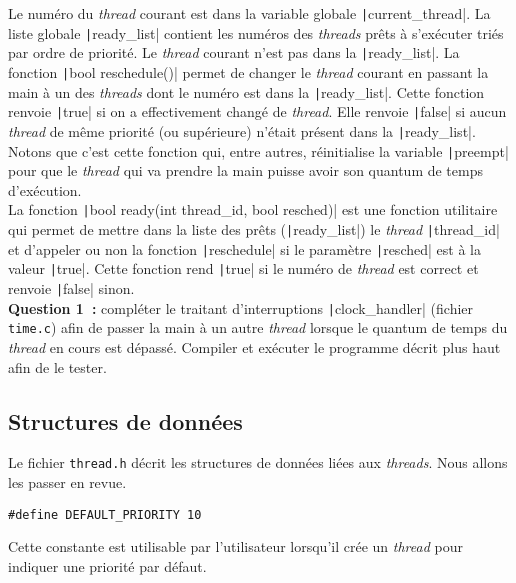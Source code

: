 \documentclass[a4paper]{article}
\begin{document}
Le numéro du \emph{thread} courant est dans la variable globale \texttt|current_thread|. La liste globale \texttt|ready_list| contient
les numéros des \emph{threads} prêts à s'exécuter triés par ordre de priorité. Le \emph{thread} courant n'est pas dans la \texttt|ready_list|.
La fonction \texttt|bool reschedule()| permet de changer le \emph{thread} courant en passant la main à un des \emph{threads} dont le numéro est dans la \texttt|ready_list|. Cette fonction renvoie \texttt|true|
si on a effectivement changé de \emph{thread}. Elle renvoie \texttt|false| si aucun \emph{thread} de même priorité (ou supérieure) n'était présent dans la \texttt|ready_list|.
Notons que c'est cette fonction qui, entre autres, réinitialise la variable \texttt|preempt| pour que le \emph{thread} qui va prendre la main
puisse avoir son quantum de temps d'exécution.\\

La fonction \texttt|bool ready(int thread_id, bool resched)| est une fonction utilitaire qui permet de mettre dans la liste des prêts
(\texttt|ready_list|) le \emph{thread} \texttt|thread_id| et d'appeler ou non la fonction \texttt|reschedule| si le paramètre \texttt|resched| est à la valeur 
\texttt|true|. Cette fonction rend \texttt|true| si le numéro de \emph{thread} est correct et renvoie \texttt|false| sinon.\\

\textbf{Question 1~:} compléter le traitant d'interruptions \texttt|clock_handler| (fichier \verb+time.c+) afin de passer la main à un autre \emph{thread} lorsque le quantum de temps du \emph{thread} en cours est dépassé. Compiler et exécuter le programme décrit plus haut afin de le tester.\\

\subsection{Structures de données}

Le fichier \verb+thread.h+ décrit les structures de données liées aux \emph{threads}. Nous allons les passer en revue.

\begin{verbatim}
#define DEFAULT_PRIORITY 10
\end{verbatim}

Cette constante est utilisable par l'utilisateur lorsqu'il crée un \emph{thread} pour indiquer une priorité par défaut.
\end{document}
